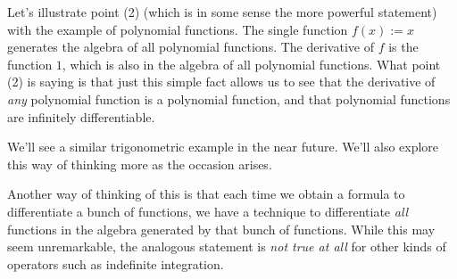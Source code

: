 \documentclass[10pt]{amsart}
\begin{document}
Let's illustrate point (2) (which is in some sense the more powerful
statement) with the example of polynomial functions. The single
function $f(x) := x$ generates the algebra of all polynomial
functions. The derivative of $f$ is the function $1$, which is also in
the algebra of all polynomial functions. What point (2) is saying is
that just this simple fact allows us to see that the derivative of
{\em any} polynomial function is a polynomial function, and that
polynomial functions are infinitely differentiable.

We'll see a similar trigonometric example in the near future. We'll
also explore this way of thinking more as the occasion arises.

Another way of thinking of this is that each time we obtain a formula
to differentiate a bunch of functions, we have a technique to
differentiate {\em all} functions in the algebra generated by that
bunch of functions. While this may seem unremarkable, the analogous
statement is {\em not true at all} for other kinds of operators such
as indefinite integration.
\end{document}
